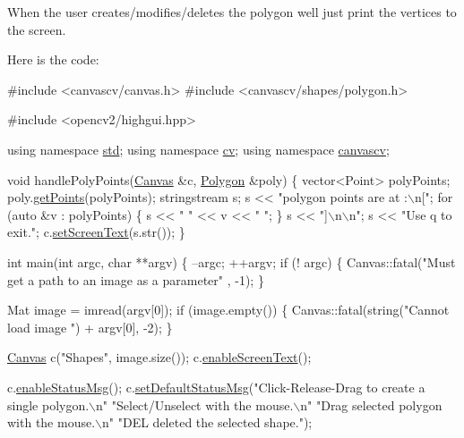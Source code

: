 When the user creates/modifies/deletes the polygon we\textquotesingle{}ll just print the vertices to the screen.

Here is the code\+: 
\begin{DoxyCode}
\textcolor{preprocessor}{#include <canvascv/canvas.h>}
\textcolor{preprocessor}{#include <canvascv/shapes/polygon.h>}

\textcolor{preprocessor}{#include <opencv2/highgui.hpp>}

\textcolor{keyword}{using namespace }\hyperlink{namespacestd}{std};
\textcolor{keyword}{using namespace }\hyperlink{namespacecv}{cv};
\textcolor{keyword}{using namespace }\hyperlink{namespacecanvascv}{canvascv};

\textcolor{keywordtype}{void} handlePolyPoints(\hyperlink{classcanvascv_1_1Canvas}{Canvas} &c, \hyperlink{classcanvascv_1_1Polygon}{Polygon} &poly)
\{
    vector<Point> polyPoints;
    poly.\hyperlink{classcanvascv_1_1Polygon_ada0df457225c06769d7a90d71f58ed7f}{getPoints}(polyPoints);
    stringstream s;
    s <<  \textcolor{stringliteral}{"polygon points are at :\(\backslash\)n["};
    \textcolor{keywordflow}{for} (\textcolor{keyword}{auto} &v : polyPoints)
    \{
        s << \textcolor{stringliteral}{" "} << v << \textcolor{stringliteral}{" "};
    \}
    s <<  \textcolor{stringliteral}{"]\(\backslash\)n\(\backslash\)n"};
    s <<  \textcolor{stringliteral}{"Use q to exit."};
    c.\hyperlink{classcanvascv_1_1Canvas_aaedea276b82a8a4cfc0895ae81113cfd}{setScreenText}(s.str());
\}

\textcolor{keywordtype}{int} main(\textcolor{keywordtype}{int} argc, \textcolor{keywordtype}{char} **argv)
\{
    --argc;
    ++argv;
    \textcolor{keywordflow}{if} (! argc)
    \{
        Canvas::fatal(\textcolor{stringliteral}{"Must get a path to an image as a parameter"} , -1);
    \}

    Mat image = imread(argv[0]);
    \textcolor{keywordflow}{if} (image.empty())
    \{
        Canvas::fatal(\textcolor{keywordtype}{string}(\textcolor{stringliteral}{"Cannot load image "}) + argv[0], -2);
    \}

    \hyperlink{classcanvascv_1_1Canvas}{Canvas} c(\textcolor{stringliteral}{"Shapes"}, image.size());
    c.\hyperlink{classcanvascv_1_1Canvas_ae68d3277e738d349232400b38f0e5f9e}{enableScreenText}();

    c.\hyperlink{classcanvascv_1_1Canvas_a402c43a42c0089c48a96e5303c1c1fe8}{enableStatusMsg}();
    c.\hyperlink{classcanvascv_1_1Canvas_a14828809edd29d789170284a86f16f23}{setDefaultStatusMsg}(\textcolor{stringliteral}{"Click-Release-Drag to create a single polygon.\(\backslash\)n"}
                          \textcolor{stringliteral}{"Select/Unselect with the mouse.\(\backslash\)n"}
                          \textcolor{stringliteral}{"Drag selected polygon with the mouse.\(\backslash\)n"}
                          \textcolor{stringliteral}{"DEL deleted the selected shape."});


\end{DoxyCode}
